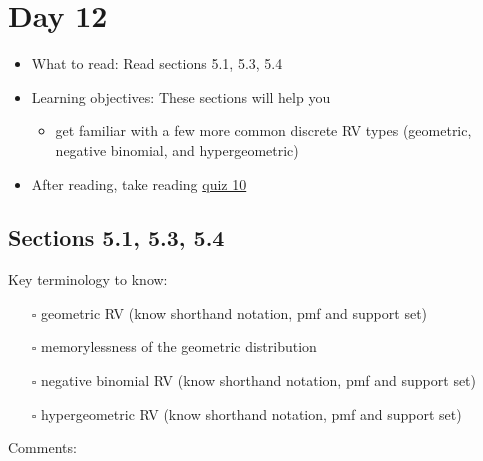 \documentclass[
  letterpaper,
]{scrbook}
\providecommand{\tightlist}{%
  \setlength{\itemsep}{0pt}\setlength{\parskip}{0pt}}\usepackage{longtable,booktabs,array}
\begin{document}
\section*{Day 12}\label{day-12}


\begin{itemize}
\item
  What to read: Read sections 5.1, 5.3, 5.4
\item
  Learning objectives: These sections will help you

  \begin{itemize}
  \tightlist
  \item
    get familiar with a few more common discrete RV types (geometric,
    negative binomial, and hypergeometric)
  \end{itemize}
\item
  After reading, take reading
  \href{https://forms.gle/BmZE2tNwiM2tcVmd8}{quiz 10}
\end{itemize}

\subsection*{Sections 5.1, 5.3, 5.4}\label{sections-5.1-5.3-5.4}

Key terminology to know:

\begin{itemize}
\tightlist
\item[$\square$]
  geometric RV (know shorthand notation, pmf and support set)
\item[$\square$]
  memorylessness of the geometric distribution
\item[$\square$]
  negative binomial RV (know shorthand notation, pmf and support set)
\item[$\square$]
  hypergeometric RV (know shorthand notation, pmf and support set)
\end{itemize}

Comments:
\end{document}
